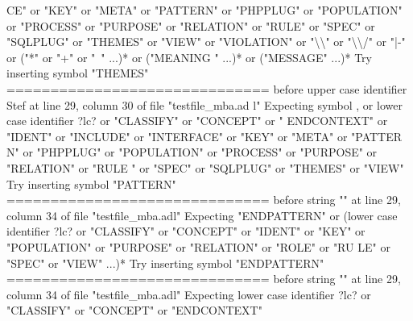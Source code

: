{  CE" or "KEY" or "META" or "PATTERN" or "PHPPLUG" or "POPULATION" or "PROCESS" or\newline
   "PURPOSE" or "RELATION" or "RULE" or "SPEC" or "SQLPLUG" or "THEMES" or "VIEW"\newline
  or "VIOLATION" or "\textbackslash{}\textbackslash{}" or "\textbackslash{}\textbackslash{}/" or "|-" or ("*" or "+" or "~" ...)* or ("MEANING\newline
  " ...)* or ("MESSAGE" ...)*\newline
  Try inserting symbol "THEMES"\newline
  \newline
  ==============================\newline
  \newline
  before upper case identifier Stef at line 29, column 30 of file "testfile\_mba.ad\newline
  l"\newline
  Expecting symbol , or lower case identifier ?lc? or "CLASSIFY" or "CONCEPT" or "\newline
  ENDCONTEXT" or "IDENT" or "INCLUDE" or "INTERFACE" or "KEY" or "META" or "PATTER\newline
  N" or "PHPPLUG" or "POPULATION" or "PROCESS" or "PURPOSE" or "RELATION" or "RULE\newline
  " or "SPEC" or "SQLPLUG" or "THEMES" or "VIEW"\newline
  Try inserting symbol "PATTERN"\newline
  \newline
  ==============================\newline
  \newline
  before string "" at line 29, column 34 of file "testfile\_mba.adl"\newline
  Expecting "ENDPATTERN" or (lower case identifier ?lc? or "CLASSIFY" or "CONCEPT"\newline
   or "IDENT" or "KEY" or "POPULATION" or "PURPOSE" or "RELATION" or "ROLE" or "RU\newline
  LE" or "SPEC" or "VIEW" ...)*\newline
  Try inserting symbol "ENDPATTERN"\newline
  \newline
  ==============================\newline
  \newline
  before string "" at line 29, column 34 of file "testfile\_mba.adl"\newline
  Expecting lower case identifier ?lc? or "CLASSIFY" or "CONCEPT" or "ENDCONTEXT"\newline
}
